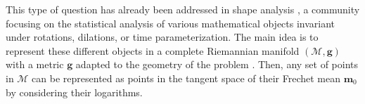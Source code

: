 
This type of question has already been addressed in shape analysis \cite{vaillant2004statistics}, a community focusing on the statistical analysis of various mathematical objects invariant under rotations, dilations, or time parameterization.
The main idea is to represent these different objects in a complete Riemannian manifold $(\mathcal{M},\mathbf{g})$ with a metric $\mathbf{g}$ adapted to the geometry of the problem \cite{miller2006geodesic}.
 Then, any set of points in $\mathcal{M}$ can be represented as points in the tangent space of their Frechet mean $\mathbf{m}_0$ \cite{pal2017riemannian,le2001locating} by considering their logarithms.

